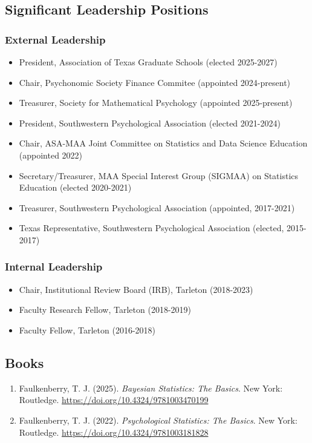 \documentclass[article,10pt]{article}
\begin{document}
\subsection*{Significant Leadership Positions}
\label{sec:org02a0f0d}
\subsubsection*{External Leadership}
\label{sec:orgd3fd68c}

\begin{itemize}
\item President, Association of Texas Graduate Schools (elected 2025-2027)
\item Chair, Psychonomic Society Finance Commitee (appointed 2024-present)
\item Treasurer, Society for Mathematical Psychology (appointed 2025-present)
\item President, Southwestern Psychological Association (elected 2021-2024)
\item Chair, ASA-MAA Joint Committee on Statistics and Data Science Education (appointed 2022)
\item Secretary/Treasurer, MAA Special Interest Group (SIGMAA) on Statistics Education (elected 2020-2021)
\item Treasurer, Southwestern Psychological Association (appointed, 2017-2021)
\item Texas Representative, Southwestern Psychological Association (elected, 2015-2017)
\end{itemize}
\subsubsection*{Internal Leadership}
\label{sec:org68db29c}

\begin{itemize}
\item Chair, Institutional Review Board (IRB), Tarleton (2018-2023)
\item Faculty Research Fellow, Tarleton (2018-2019)
\item Faculty Fellow, Tarleton (2016-2018)
\end{itemize}
\subsection*{Books}
\label{sec:org1962bb2}
\begin{enumerate}
\item Faulkenberry, T. J. (2025). \emph{Bayesian Statistics: The Basics}. New York: Routledge. \url{https://doi.org/10.4324/9781003470199}
\item Faulkenberry, T. J. (2022). \emph{Psychological Statistics: The Basics}. New York: Routledge. \url{https://doi.org/10.4324/9781003181828}
\end{enumerate}
\end{document}

